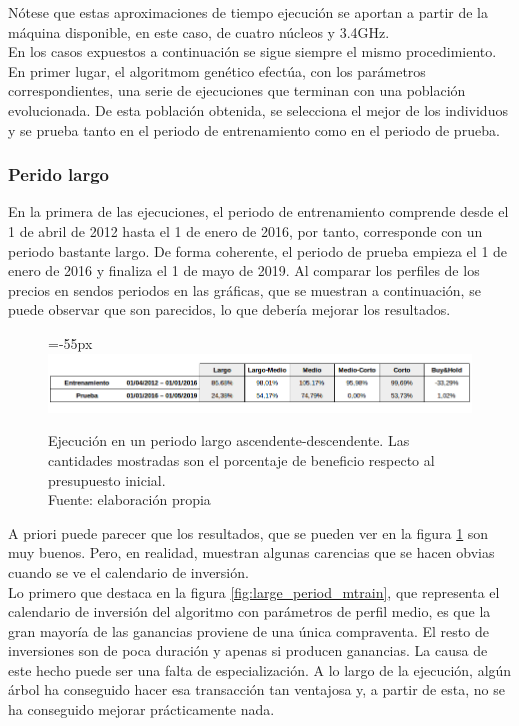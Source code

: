 N\'otese que estas aproximaciones de tiempo ejecuci\'on se aportan a partir de la m\'aquina disponible, en este caso, de cuatro n\'ucleos y 3.4GHz.\\

En los casos expuestos a continuaci\'on se sigue siempre el mismo procedimiento. En primer lugar, el algoritmom gen\'etico efect\'ua, con los par\'ametros correspondientes, una serie de ejecuciones que terminan con una poblaci\'on evolucionada. De esta poblaci\'on obtenida, se selecciona el mejor de los individuos y se prueba tanto en el periodo de entrenamiento como en el periodo de prueba.

\subsubsection{Perido largo}

En la primera de las ejecuciones, el periodo de entrenamiento comprende desde el 1 de abril de 2012 hasta el 1 de enero de 2016, por tanto, corresponde con un periodo bastante largo. De forma coherente, el periodo de prueba empieza el 1 de enero de 2016 y finaliza el 1 de mayo de 2019. Al comparar los perfiles de los precios en sendos periodos en las gr\'aficas, que se muestran a continuaci\'on, se puede observar que son parecidos, lo que deber\'ia mejorar los resultados.\\

     	\begin{figure}[H]
     		\centering\leftskip=-55px
     		\includegraphics[scale=0.60]{imagenes/Large_period.png}
     		\caption[Ejecuci\'on en un periodo largo ascendente-descendente]{Ejecuci\'on en un periodo largo ascendente-descendente. Las cantidades mostradas son el porcentaje de beneficio respecto al presupuesto inicial.\\ Fuente: elaboraci\'on propia}
     		\label{fig:large_period}
     	\end{figure}
     	
A priori puede parecer que los resultados, que se pueden ver en la figura \ref{fig:large_period} son muy buenos. Pero, en realidad, muestran algunas carencias que se hacen obvias cuando se ve el calendario de inversi\'on.\\

Lo primero que destaca en la figura \ref{fig:large_period_mtrain}, que representa el calendario de inversi\'on del algoritmo con par\'ametros de perfil medio, es que la gran mayor\'ia de las ganancias proviene de una \'unica compraventa. El resto de inversiones son de poca duraci\'on y apenas si producen ganancias. La causa de este hecho puede ser una falta de especializaci\'on. A lo largo de la ejecuci\'on, alg\'un \'arbol ha conseguido hacer esa transacci\'on tan ventajosa y, a partir de esta, no se ha conseguido mejorar pr\'acticamente nada.


